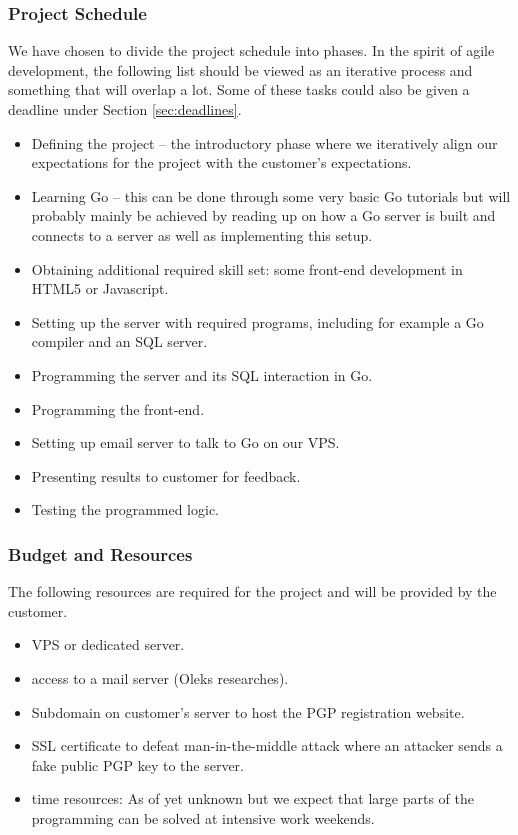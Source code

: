 \documentclass[11pt,a4paper]{report}
\begin{document}
\subsubsection{Project Schedule}
We have chosen to divide the project schedule into phases. In the spirit of agile development, the following list should be viewed as an iterative process and something that will overlap a lot. Some of these tasks could also be given a deadline under Section \ref{sec:deadlines}.
\begin{itemize}
\item Defining the project -- the introductory phase where we iteratively align our expectations for the project with the customer's expectations.
\item Learning Go -- this can be done through some very basic Go tutorials but will probably mainly be achieved by reading up on how a Go server is built and connects to a server as well as implementing this setup.
\item Obtaining additional required skill set: some front-end development in HTML5 or Javascript.
\item Setting up the server with required programs, including for example a Go compiler and an SQL server.
\item Programming the server and its SQL interaction in Go.
\item Programming the front-end.
\item Setting up email server to talk to Go on our VPS.
\item Presenting results to customer for feedback.
\item Testing the programmed logic.
\end{itemize}
\subsubsection{Budget and Resources}
The following resources are required for the project and will be provided by the customer.
\begin{itemize}
\item VPS or dedicated server.
\item access to a mail server (Oleks researches).
\item Subdomain on customer's server to host the PGP registration website.
\item SSL certificate to defeat man-in-the-middle attack where an attacker sends a fake public PGP key to the server.
\item time resources: As of yet unknown but we expect that large parts of the programming can be solved at intensive work weekends.
\end{itemize}
\end{document}

